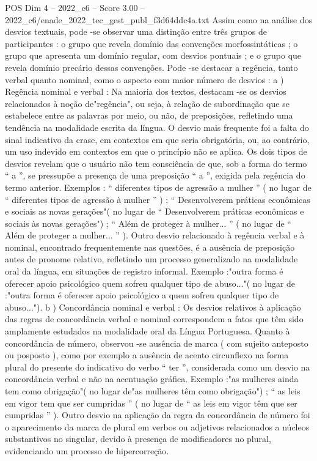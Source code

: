 \begin{textsample}{POS Dim 4 – 2022\_c6 – Score 3.00 – 2022\_c6/enade\_2022\_tec\_gest\_publ\_f3d64ddc4a.txt}
Assim como na análise dos desvios textuais, pode -se observar uma distinção entre três grupos de participantes : o grupo que revela domínio das convenções morfossintáticas ; o grupo que apresenta um domínio regular, com desvios pontuais ; e o grupo que revela domínio precário dessas convenções.
Pode -se destacar a regência, tanto verbal quanto nominal, como o aspecto com maior número de desvios : a ) Regência nominal e verbal : Na maioria dos textos, destacam -se os desvios relacionados à noção de"regência", ou seja, à relação de subordinação que se estabelece entre as palavras por meio, ou não, de preposições, refletindo uma tendência na modalidade escrita da língua.
O desvio mais frequente foi a falta do sinal indicativo da crase, em contextos em que seria obrigatória, ou, ao contrário, um uso indevido em contextos em que o princípio não se aplica.
Os dois tipos de desvios revelam que o usuário não tem consciência de que, sob a forma do termo “ a ”, se pressupõe a presença de uma preposição “ a ”, exigida pela regência do termo anterior.
Exemplos : “ diferentes tipos de agressão a mulher ” ( no lugar de “ diferentes tipos de agressão à mulher ” ) ; “ Desenvolverem práticas econômicas e sociais as novas gerações"( no lugar de “ Desenvolverem práticas econômicas e sociais às novas gerações") ; “ Além de proteger à mulher... ” ( no lugar de “ Além de proteger a mulher... ” ).
Outro desvio relacionado à regência verbal e à nominal, encontrado frequentemente nas questões, é a ausência de preposição antes de pronome relativo, refletindo um processo generalizado na modalidade oral da língua, em situações de registro informal.
Exemplo :"outra forma é oferecer apoio psicológico quem sofreu qualquer tipo de abuso..."( no lugar de :"outra forma é oferecer apoio psicológico a quem sofreu qualquer tipo de abuso..."). b ) Concordância nominal e verbal : Os desvios relativos à aplicação das regras de concordância verbal e nominal correspondem a fatos que têm sido amplamente estudados na modalidade oral da Língua Portuguesa.
Quanto à concordância de número, observou -se ausência de marca ( com sujeito anteposto ou posposto ), como por exemplo a ausência de acento circunflexo na forma plural do presente do indicativo do verbo “ ter ”, considerada como um desvio na concordância verbal e não na acentuação gráfica.
Exemplo :"as mulheres ainda tem como obrigação"( no lugar de"as mulheres têm como obrigação") ; “ as leis em vigor tem que ser cumpridas ” ( no lugar de “ as leis em vigor têm que ser cumpridas ” ).
Outro desvio na aplicação da regra da concordância de número foi o aparecimento da marca de plural em verbos ou adjetivos relacionados a núcleos substantivos no singular, devido à presença de modificadores no plural, evidenciando um processo de hipercorreção.

\end{textsample}
